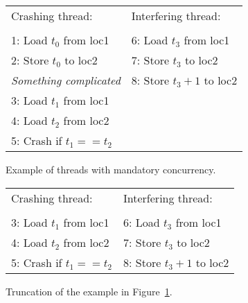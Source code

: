 \begin{figure}
\begin{tabular}{ll}
Crashing thread:               & Interfering thread: \\
\\
1: Load $t_0$ from loc1        & 6: Load $t_3$ from loc1 \\
2: Store $t_0$ to loc2         & 7: Store $t_3$ to loc2 \\
\textit{Something complicated} & 8: Store $t_3 + 1$ to loc2 \\
3: Load $t_1$ from loc1        & \\
4: Load $t_2$ from loc2        & \\
5: Crash if $t_1 == t_2$ & \\
\end{tabular}
\caption{Example of threads with mandatory concurrency.}
\label{fig:mandatory_concurrency1}
\end{figure}

\begin{figure}
\begin{tabular}{ll}
Crashing thread:          & Interfering thread: \\
\\
3: Load $t_1$ from loc1   & 6: Load $t_3$ from loc1 \\
4: Load $t_2$ from loc2   & 7: Store $t_3$ to loc2 \\
5: Crash if $t_1 == t_2$  & 8: Store $t_3 + 1$ to loc2
\end{tabular}
\caption{Truncation of the example in Figure~\ref{fig:mandatory_concurrency1}.}
\label{fig:mandatory_concurrency2}
\end{figure}

